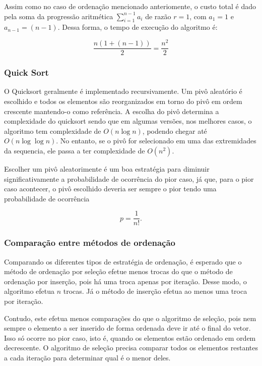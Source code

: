 \documentclass[
]{article}
\begin{document}
Assim como no caso de ordenação mencionado anteriomente, o custo total é
dado pela soma da progressão aritmética
\(\sum\limits_{i = 1}^{n-1} a_i\) de razão \(r = 1\), com \(a_1 = 1\) e
\(a_{n-1} = (n-1)\). Dessa forma, o tempo de execução do algoritmo é:

\begin{equation}
  \frac{n(1+(n-1))}{2} = \frac{n^2}{2}
\end{equation}

\hypertarget{quick-sort}{%
\subsubsection{Quick Sort}\label{quick-sort}}

O Quicksort geralmente é implementado recursivamente. Um pivô aleatório
é escolhido e todos os elementos são reorganizados em torno do pivô em
ordem crescente mantendo-o como referência. A escolha do pivô determina
a complexidade do quicksort sendo que em algumas versões, nos melhores
casos, o algoritmo tem complexidade de \(O(n \log n)\), podendo chegar
até \(O(n \log \log n)\). No entanto, se o pivô for selecionado em uma
das extremidades da sequencia, ele passa a ter complexidade de
\(O(n^2)\).

Escolher um pivô aleatorimente é um boa estratégia para diminuir
significativamente a probabilidade de ocorrência do pior caso, já que,
para o pior caso acontecer, o pivô escolhido deveria ser sempre o pior
tendo uma probabilidade de ocorrência

\begin{equation}
  p = \frac{1}{n!}.
\end{equation}

\hypertarget{comparauxe7uxe3o-entre-muxe9todos-de-ordenauxe7uxe3o}{%
\subsubsection{Comparação entre métodos de
ordenação}\label{comparauxe7uxe3o-entre-muxe9todos-de-ordenauxe7uxe3o}}

Comparando os diferentes tipos de estratégia de ordenação, é esperado
que o método de ordenação por seleção efetue menos trocas do que o
método de ordenação por inserção, pois há uma troca apenas por iteração.
Desse modo, o algoritmo efetua \(n\) trocas. Já o método de inserção
efetua ao menos uma troca por iteração.

Contudo, este efetua menos comparações do que o algoritmo de seleção,
pois nem sempre o elemento a ser inserido de forma ordenada deve ir até
o final do vetor. Isso só ocorre no pior caso, isto é, quando os
elementos estão ordenado em ordem decrescente. O algoritmo de seleção
precisa comparar todos os elementos restantes a cada iteração para
determinar qual é o menor deles.
\end{document}
